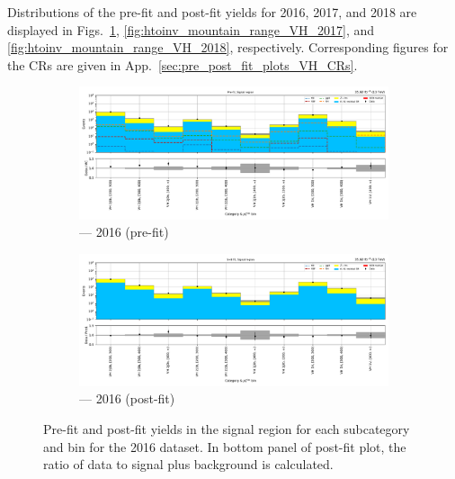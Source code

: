 Distributions of the pre-fit and post-fit yields for 2016, 2017, and 2018 are displayed in Figs.~\ref{fig:htoinv_mountain_range_VH_2016}, \ref{fig:htoinv_mountain_range_VH_2017}, and \ref{fig:htoinv_mountain_range_VH_2018}, respectively. Corresponding figures for the \glspl{CR} are given in App.~\ref{sec:pre_post_fit_plots_VH_CRs}.

\begin{figure}[htbp]
    \centering
    \begin{subfigure}[b]{0.9\textwidth}
        \includegraphics[width=\textwidth]{figures/mountain_ranges/2016/VH/SR_tree_prefit-abs_values_VH_cats.pdf}
        \caption{\VH --- 2016 (pre-fit)}
    \end{subfigure}

    \begin{subfigure}[b]{0.9\textwidth}
        \includegraphics[width=\textwidth]{figures/mountain_ranges/2016/VH/SR_tree_fit_s-abs_values_VH_cats.pdf}
        \caption{\VH --- 2016 (post-fit)}
    \end{subfigure}
    \caption[Pre-fit and post-fit yields in the signal region for each \VH subcategory and \ptmiss bin for the 2016 dataset]{Pre-fit and post-fit yields in the signal region for each \VH subcategory and \ptmiss bin for the 2016 dataset. In bottom panel of post-fit plot, the ratio of data to signal plus background is calculated.}
    \label{fig:htoinv_mountain_range_VH_2016}
\end{figure}

